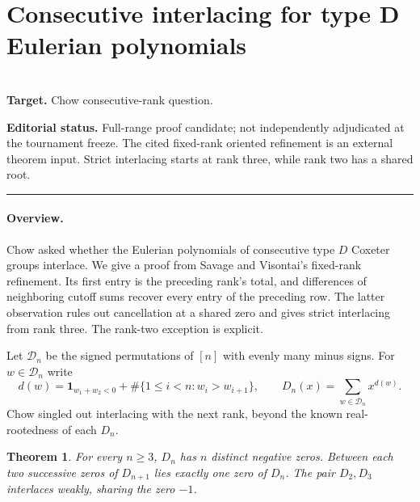 \documentclass[11pt,a4paper]{article}
\newtheorem{SourceRcbStheorem}{Theorem}
\begin{document}
\clearpage

\section{Consecutive interlacing for type D Eulerian polynomials}
\label{section:R21S}
\\[3pt]
\noindent\textbf{Target.} Chow consecutive-rank question.

\noindent\textbf{Editorial status.} Full-range proof candidate; not independently adjudicated at the tournament freeze. The cited fixed-rank oriented refinement is an external theorem input. Strict interlacing starts at rank three, while rank two has a shared root.

\smallskip\hrule\medskip



\begingroup
\newcommand{\DD}{\mathcal D}
\setcounter{equation}{0}
\renewcommand{\theequation}{\thesection.\arabic{equation}}
\renewcommand{\theHequation}{R21S.\arabic{equation}}
\paragraph{Overview.}
Chow asked whether the Eulerian polynomials of consecutive type $D$ Coxeter groups interlace. We give a proof from Savage and Visontai's fixed-rank refinement. Its first entry is the preceding rank's total, and differences of neighboring cutoff sums recover every entry of the preceding row. The latter observation rules out cancellation at a shared zero and gives strict interlacing from rank three. The rank-two exception is explicit.


Let $\DD_n$ be the signed permutations of $[n]$ with evenly many minus signs. For $w\in\DD_n$ write
\[
 d(w)=\mathbf1_{w_1+w_2<0}+\#\{1\le i<n:w_i>w_{i+1}\},
 \qquad D_n(x)=\sum_{w\in\DD_n}x^{d(w)} .
\]
Chow \cite[Sec.~5]{R21S:chow} singled out interlacing with the next rank, beyond the known real-rootedness of each $D_n$.
\begin{SourceRcbStheorem}\label{R21S:thm}
For every $n\ge3$, $D_n$ has $n$ distinct negative zeros. Between each two successive zeros of $D_{n+1}$ lies exactly one zero of $D_n$. The pair $D_2,D_3$ interlaces weakly, sharing the zero $-1$.
\end{SourceRcbStheorem}
\end{document}
